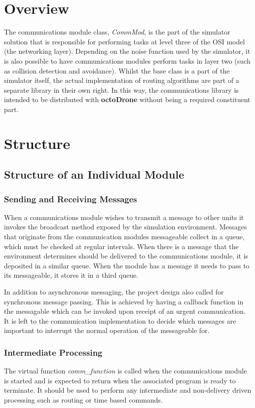 \section{Overview}
The communications module class, \textit{CommMod}, is the part of the simulator solution that is responsible for performing tasks at level three of the OSI model (the networking layer). Depending on the noise function used by the simulator, it is also possible to have communications modules perform tasks in layer two (such as collision detection and avoidance). Whilst the base class is a part of the simulator itself, the actual implementation of routing algorithms are part of a separate library in their own right. In this way, the communications library is intended to be distributed with \textbf{octoDrone} without being a required constituent part.

\section{Structure}
\subsection{Structure of an Individual Module}
\subsubsection{Sending and Receiving Messages}
		
When a communications module wishes to transmit a message to other units it invokes the broadcast method exposed by the simulation environment. Messages that originate from the communication modules messageable collect in a queue, which must be checked at regular intervals. When there is a message that the environment determines should be delivered to the communications module, it is deposited in a similar queue. When the module has a message it needs to pass to its messageable, it stores it in a third queue.

In addition to asynchronous messaging, the project design also called for synchronous message passing. This is achieved by having a callback function in the messagable which can be invoked upon receipt of an urgent communication. It is left to the communication implementation to decide which messages are important to interrupt the normal operation of the messageable for.
		
\subsubsection{Intermediate Processing}
The virtual function \textit{comm_function} is called when the communications module is started and is expected to return when the associated program is ready to terminate. It should be used to perform any intermediate and non-delivery driven processing such as routing or time based commands.
		
